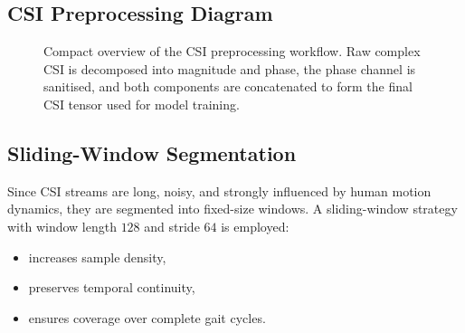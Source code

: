 \subsection{CSI Preprocessing Diagram}

\begin{figure}[H]
\centering
{}
\caption{Compact overview of the CSI preprocessing workflow. Raw complex CSI is
decomposed into magnitude and phase, the phase channel is sanitised, and both
components are concatenated to form the final CSI tensor used for model
training.}
\label{fig:csi_preproc_pipeline}
\end{figure}


\subsection{Sliding-Window Segmentation}

Since CSI streams are long, noisy, and strongly influenced by human motion dynamics, they are segmented into fixed-size windows. A sliding-window strategy with window length \(128\) and stride \(64\) is employed:
\begin{itemize}
    \item increases sample density,
    \item preserves temporal continuity,
    \item ensures coverage over complete gait cycles.
\end{itemize}

